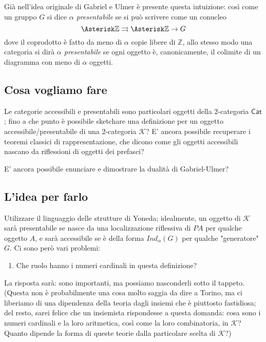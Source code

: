 \documentclass[11pt]{article}
\def\Cat{\mathsf{Cat}}
\theoremstyle{reference}
\begin{document}
Già nell'idea originale di Gabriel e Ulmer è presente questa
intuizione: così come un gruppo \(G\) si dice \emph{$\alpha$ presentabile} 
se si può scrivere come un conucleo 
\[
\Asterisk \mathbb Z \rightrightarrows \Asterisk \mathbb Z
\to G 
\] 
dove il coprodotto è fatto da meno di \(\alpha\) copie libere
di \(\mathbb Z\), allo stesso modo una categoria si dirà
\emph{$\alpha$ presentabile} se ogni oggetto è,
canonicamente, il colimite di un diagramma con meno di
\(\alpha\) oggetti.

\subsection{Cosa vogliamo fare}
\label{sec:org2bb9524}

Le categorie accessibili e presentabili sono particolari
oggetti della 2-categoria \(\Cat\); fino a che punto è
possibile sketchare una definizione per un oggetto
accessibile/presentabile di una 2-categoria \(\mathcal K\)? E'
ancora possibile recuperare i teoremi classici di
rappresentazione, che dicono come gli oggetti accessibili
nascano da riflessioni di oggetti dei prefasci?

E' ancora possibile enunciare e dimostrare la dualità di
Gabriel-Ulmer?

\subsection{L'idea per farlo}
\label{sec:org6c70953}

Utilizzare il linguaggio delle strutture di Yoneda;
idealmente, un oggetto di \(\mathcal K\) sarà presentabile se
nasce da una localizzazione riflessiva di \(PA\) per qualche
oggetto \(A\), e sarà accessibile se è della forma
\(Ind_\alpha(G)\) per qualche "generatore" \(G\). Ci sono però
vari problemi:

\begin{enumerate}
\item Che ruolo hanno i numeri cardinali in questa definizione?
\end{enumerate}
La risposta sarà: sono importanti, ma possiamo nasconderli
sotto il tappeto. (Questa non è probabilmente una cosa molto
saggia da dire a Torino, ma ci liberiamo di una dipendenza
della teoria dagli insiemi che è piuttosto fastidiosa; del
resto, sarei felice che un insiemista rispondesse a questa
domanda: cosa sono i numeri cardinali e la loro aritmetica,
così come la loro combinatoria, in \(\mathcal K\)? Quanto dipende la
forma di queste teorie dalla particolare scelta di \(\mathcal K\)?)
\end{document}
